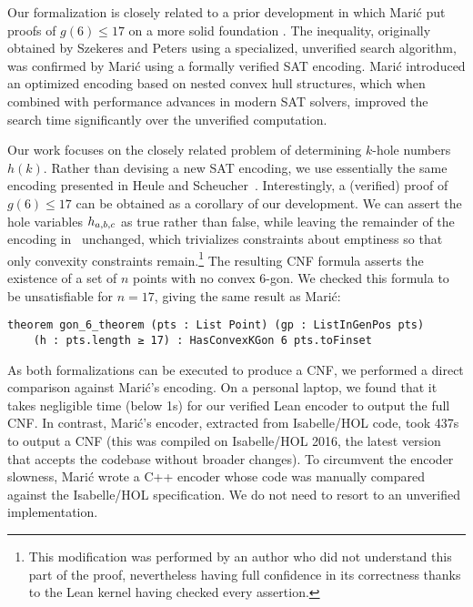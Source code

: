 Our formalization is closely related to a prior development
in which Marić put proofs of $g(6) \leq 17$ on a more solid foundation \cite{19maric_fast_formal_proof_erdos_szekeres_conjecture_convex_polygons_most_six_points}.
The inequality,
originally obtained by Szekeres and Peters \cite{06szekeres_computer_solution_17_point_erdos_szekeres_problem}
using a specialized, unverified search algorithm,
was confirmed by Marić using a formally verified SAT encoding.
Marić introduced an optimized encoding based on nested convex hull structures,
which when combined with performance advances in modern SAT solvers,
improved the search time significantly over the unverified computation.

Our work focuses on the closely related problem
of determining $k$-hole numbers $h(k)$.
Rather than devising a new SAT encoding,
we use essentially the same encoding presented in Heule and Scheucher~\cite{emptyHexagonNumber}.
Interestingly,
a (verified) proof of $g(6) \leq 17$ can be obtained
as a corollary of our development.
We can assert the hole variables $\hvar_{a,b,c}$ as true rather than false,
while leaving the remainder of the encoding in~ unchanged,
which trivializes constraints about emptiness
so that only convexity constraints remain.\footnote{
This modification was performed by an author
who did not understand this part of the proof,
nevertheless having full confidence in its correctness
thanks to the Lean kernel having checked every assertion.}
The resulting CNF formula
asserts the existence of a set of $n$ points
with no convex $6$-gon.
We checked this formula to be unsatisfiable for $n = 17$,
giving the same result as Marić:
\begin{lstlisting}
theorem gon_6_theorem (pts : List Point) (gp : ListInGenPos pts)
    (h : pts.length ≥ 17) : HasConvexKGon 6 pts.toFinset
\end{lstlisting}

As both formalizations can be executed to produce a CNF,
we performed a direct comparison against Marić's encoding.
On a personal laptop,
we found that it takes negligible time (below 1s)
for our verified Lean encoder to output the full CNF.
In contrast,
Marić's encoder, extracted from Isabelle/HOL code,
took 437s to output a CNF
(this was compiled on Isabelle/HOL 2016,
the latest version that accepts the codebase without broader changes).
To circumvent the encoder slowness,
Marić wrote a C++ encoder
whose code was manually compared against the Isabelle/HOL specification.
We do not need to resort to an unverified implementation.

